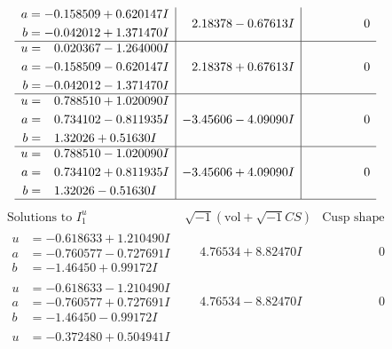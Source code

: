 \documentclass[1p]{elsarticle_modified}
\theoremstyle{definition}
\newcommand{\I}{\sqrt{-1}}
\begin{document}
$$\begin{array}{c|c|c}
\begin{aligned}
a &= -0.158509 + 0.620147 I \\
b &= -0.042012 + 1.371470 I\end{aligned}
 & \phantom{-}2.18378 - 0.67613 I & \phantom{-0.000000 } 0 \\ \hline\begin{aligned}
u &= \phantom{-}0.020367 - 1.264000 I \\
a &= -0.158509 - 0.620147 I \\
b &= -0.042012 - 1.371470 I\end{aligned}
 & \phantom{-}2.18378 + 0.67613 I & \phantom{-0.000000 } 0 \\ \hline\begin{aligned}
u &= \phantom{-}0.788510 + 1.020090 I \\
a &= \phantom{-}0.734102 - 0.811935 I \\
b &= \phantom{-}1.32026 + 0.51630 I\end{aligned}
 & -3.45606 - 4.09090 I & \phantom{-0.000000 } 0 \\ \hline\begin{aligned}
u &= \phantom{-}0.788510 - 1.020090 I \\
a &= \phantom{-}0.734102 + 0.811935 I \\
b &= \phantom{-}1.32026 - 0.51630 I\end{aligned}
 & -3.45606 + 4.09090 I & \phantom{-0.000000 } 0\\
 \hline 
 \end{array}$$\newpage$$\begin{array}{c|c|c}  
\text{Solutions to }I^u_{1}& \I (\text{vol} + \sqrt{-1}CS) & \text{Cusp shape}\\
 \hline 
\begin{aligned}
u &= -0.618633 + 1.210490 I \\
a &= -0.760577 - 0.727691 I \\
b &= -1.46450 + 0.99172 I\end{aligned}
 & \phantom{-}4.76534 + 8.82470 I & \phantom{-0.000000 } 0 \\ \hline\begin{aligned}
u &= -0.618633 - 1.210490 I \\
a &= -0.760577 + 0.727691 I \\
b &= -1.46450 - 0.99172 I\end{aligned}
 & \phantom{-}4.76534 - 8.82470 I & \phantom{-0.000000 } 0 \\ \hline\begin{aligned}
u &= -0.372480 + 0.504941 I \\

\end{aligned}
\end{array}$$
\end{document}
